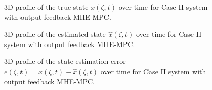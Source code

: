 \begin{figure}[!htbp]
    \centering
    
    \caption{3D profile of the true state $x(\zeta, t)$ over time for Case II system with output feedback MHE-MPC.}
    \label{fig:MHE_x_true}
\end{figure}

\begin{figure}[!htbp]
    \centering
    
    \caption{3D profile of the estimated state $\hat{x}(\zeta, t)$ over time for Case II system with output feedback MHE-MPC.}
    \label{fig:MHE_x_estimated}
\end{figure}

\begin{figure}[!htbp]
    \centering
    
    \caption{3D profile of the state estimation error $e(\zeta, t) = x(\zeta, t) - \hat{x}(\zeta, t)$ over time for Case II system with output feedback MHE-MPC.}
    \label{fig:MHE_err}
\end{figure}